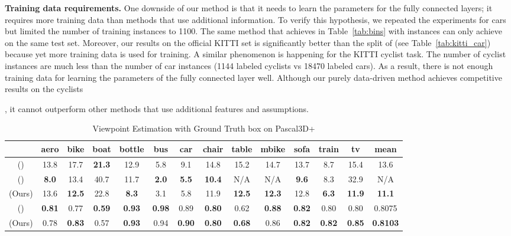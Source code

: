 \documentclass[10pt,twocolumn,letterpaper]{article}
\newif\ifarxiv
\begin{document}
\noindent\textbf{Training data requirements.}
One downside of our method is that it needs to learn the parameters for the fully connected layers; it requires more training data than methods that use additional information. To verify this hypothesis, we repeated the experiments for cars but limited the number of training instances to 1100. The same method that achieves  in Table~\ref{tab:bins} with  instances can only achieve  on the same test set. Moreover, our results on the official KITTI set is significantly better than the split of \cite{3DVP15} (see Table~\ref{tab:kitti_car}) because yet more training data is used for training. A similar phenomenon is happening for the KITTI cyclist task. The number of cyclist instances are much less than the number of car instances (1144 labeled cyclists vs 18470 labeled cars). As a result, there is not enough training data for learning the parameters of the fully connected layer well. Although our purely data-driven method achieves competitive results on the cyclists
\ifarxiv 
(see Table~\ref{tab:kitti_cyclist})
\fi
, it cannot outperform other methods that use additional features and assumptions.





\begin{table*}
\centering
\begin{tabular}{c | c c c c c c c c c c c c| c }
\hline
& aero &bike& boat& bottle& bus& car& chair& table& mbike& sofa& train& tv & mean\\
\hline
(\cite{TulsianiCVPR15}) & 13.8 &17.7& {\bf 21.3}& 12.9& 5.8& 9.1& 14.8& 15.2& 14.7& 13.7& 8.7& 15.4  & 13.6\\
(\cite{PavlakosICRA17}) & {\bf 8.0}& 13.4& 40.7& 11.7& {\bf 2.0}& {\bf 5.5} & {\bf 10.4} & N/A & N/A & {\bf 9.6} & 8.3 & 32.9 & N/A\\
(Ours) &  13.6 & {\bf 12.5} & 22.8 & {\bf 8.3} & 3.1&  5.8 & 11.9 & {\bf 12.5} & {\bf 12.3} & 12.8 &{\bf 6.3}& {\bf 11.9} & {\bf 11.1}\\
\hline
(\cite{TulsianiCVPR15})& {\bf 0.81}& 0.77& {\bf 0.59}& {\bf 0.93}& {\bf 0.98}& 0.89& {\bf 0.80}& 0.62& {\bf 0.88}& {\bf 0.82}& 0.80& 0.80& 0.8075\\
(Ours)& 0.78& {\bf 0.83}& 0.57& {\bf 0.93} &0.94& {\bf 0.90}& {\bf 0.80}& {\bf 0.68}& 0.86& {\bf 0.82}& {\bf 0.82}& {\bf 0.85} & {\bf 0.8103} 
\end{tabular}
\caption{ Viewpoint Estimation with Ground Truth box on Pascal3D+}
\label{tab:pascal_viewpoint}
\end{table*}
\end{document}
